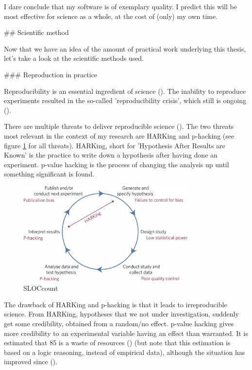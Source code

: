 I dare conclude that my software is of exemplary quality. I predict this
will be most effective for science as a whole, at the cost of (only) my own time.

## Scientific method

Now that we have an idea of the amount of practical work underlying
this thesis, let's take a look at the scientific methods used.

### Reproduction in practice

Reproducibility is an essential ingredient of science (\cite{mcnutt2014reproducibility}).
The inability to reproduce experiments resulted in the so-called 'reproducibility
crisis', which still is ongoing (\cite{schooler2014metascience}).

There are multiple threats to deliver reproducible 
science (\cite{munafo2017manifesto}).
The two threats most relevant in the context
of my research are HARKing and p-hacking (see 
figure \ref{fig:manifesto} for all threats).
HARKing, short for 'Hypothesis After Results are Known' is the practice
to write down a hypothesis after having done an experiment.
p-value hacking is the process of changing the analysis up until
something significant is found. 

\begin{figure}[H]
  \includegraphics[width=0.8\textwidth]{munafo2017manifesto_fig_1.jpg}
  \caption{
    SLOCcount 
  }
  \label{fig:manifesto}
\end{figure}

The drawback of HARKing and p-hacking is that it leads to
irreproducible science. From HARKing, hypotheses that we not under
investigation, suddenly get some credibility, obtained from a
random/no effect. p-value hacking gives more credibility 
to an experimental variable having an effect than warranted.
It is estimated that 85%
is a waste of resources (\cite{chalmers2009avoidable}) (but note
that this estimation is based on a logic reasoning, instead
of empirical data), although the situation has improved 
since (\cite{macleod2014biomedical}). 

